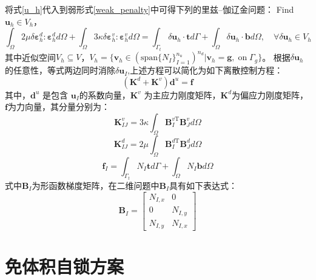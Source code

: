 将式\eqref{u_h}代入到弱形式\eqref{weak_penalty}中可得下列的里兹--伽辽金问题：
Find $\boldsymbol u_h \in V_h$，
\begin{equation}\label{ritz_penalty}
\int_\Omega 2\mu \delta \boldsymbol \varepsilon^d_h : \boldsymbol \varepsilon^d_h d\Omega +
\int_\Omega 3\kappa \delta \boldsymbol \varepsilon^v_h : \boldsymbol \varepsilon^v_h d\Omega =
\int_{\Gamma_t} \delta \boldsymbol u_h \cdot \boldsymbol t d\Gamma + \int_\Omega \delta \boldsymbol u_h \cdot \boldsymbol b d\Omega, \quad
\forall \delta \boldsymbol u_h \in V_h
\end{equation}
其中近似空间$V_h \subseteq V$，$V_h = \{\boldsymbol v_h \in (\mathrm{span}\{N_I\}_{I=1}^{n_u})^{n_d} \vert \boldsymbol v_h = \boldsymbol g,\; \mathrm{on} \; \Gamma_g\}$。
根据$\delta \boldsymbol u_h$的任意性，等式两边同时消除$\delta \boldsymbol u_I$,上述方程可以简化为如下离散控制方程：
\begin{equation}\label{equilibrium_penalty}
    (\boldsymbol K^d +\boldsymbol K^v) \boldsymbol d^u = \boldsymbol f
\end{equation}
其中，$\boldsymbol d^u$ 是包含 $\boldsymbol u_I$的系数向量，$\boldsymbol K^v$ 为主应力刚度矩阵，$\boldsymbol K^d$为偏应力刚度矩阵，$\boldsymbol f$为力向量，其分量分别为：
\begin{equation}\label{stiffness_vol}
    \boldsymbol K^v_{IJ}=  3\kappa\int_{\Omega} \boldsymbol B^{v\mathrm T}_I \boldsymbol B^v_J d\Omega
\end{equation}
\begin{equation}\label{stiffness_dev}
    \boldsymbol K^d_{IJ}= 2\mu\int_{\Omega} \boldsymbol B^{d\mathrm T}_I \boldsymbol B^d_J d\Omega
\end{equation}
\begin{equation}
    \boldsymbol f_I = \int_{\Gamma_t} N_I \boldsymbol t d\Gamma + \int_{\Omega} N_I \boldsymbol b d\Omega
\end{equation}
式中$\boldsymbol B_I$为形函数梯度矩阵，在二维问题中$\boldsymbol B_I$具有如下表达式：
\begin{equation}\label{strain vector}
    \pmb{B}_I= \left[\begin{matrix}N_{I,x}&0\\0&N_{I,y}\\N_{I,y}&N_{I,x} \end{matrix}\right] 
\end{equation}
\section{免体积自锁方案}

